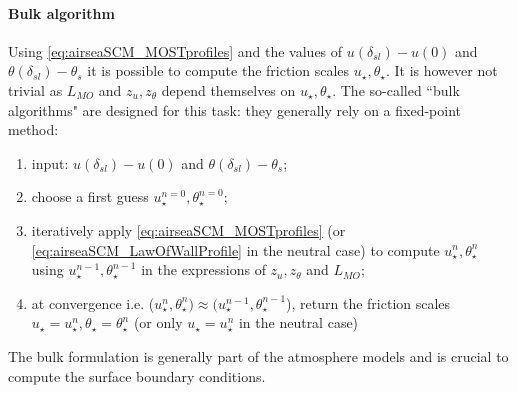\paragraph{Bulk algorithm}
Using \eqref{eq:airseaSCM_MOSTprofiles} and the values of
$u(\delta_{sl}) - u(0)$ and $\theta(\delta_{sl}) - \theta_s$
it is possible to compute the friction scales
$u_\star, \theta_\star$. It is however not trivial as
$L_{MO}$ and $z_u, z_\theta$ depend themselves on
$u_\star, \theta_\star$.
The so-called ``bulk algorithms" are designed for this
task: they generally rely on a fixed-point method:
\begin{enumerate}
\item input: $u(\delta_{sl}) - u(0)$
		and $\theta(\delta_{sl}) - \theta_s$;
\item choose a first guess $u_\star^{n=0}, \theta_\star^{n=0}$;
\item iteratively apply
	\eqref{eq:airseaSCM_MOSTprofiles} (or
	\eqref{eq:airseaSCM_LawOfWallProfile} in the neutral case)
	to compute $u_\star^{n}, \theta_\star^{n}$ using
	$u_\star^{n-1}, \theta_\star^{n-1}$
	in the expressions of $z_u, z_\theta$ and $L_{MO}$;
\item at convergence i.e. ($u_\star^{n},\theta_\star^{n}) \approx
	(u_\star^{n-1},\theta_\star^{n-1}$), return the friction
		scales $u_\star = u_\star^{n},
		\theta_\star = \theta_\star^{n}$ (or only
		$u_\star = u_\star^{n}$ in the neutral case)
\end{enumerate}
The bulk formulation is generally part of the atmosphere models and
is crucial to compute the surface boundary conditions. 
